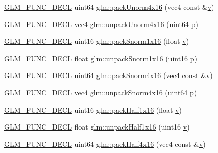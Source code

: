 \begin{DoxyCompactItemize}
\item 
\mbox{\hyperlink{setup_8hpp_ab2d052de21a70539923e9bcbf6e83a51}{G\+L\+M\+\_\+\+F\+U\+N\+C\+\_\+\+D\+E\+CL}} uint64 \mbox{\hyperlink{group__gtc__packing_gac561f06c908b7302537a8ef29fcb409e}{glm\+::pack\+Unorm4x16}} (vec4 const \&\mbox{\hyperlink{glad_8h_a14cfbe2fc2234f5504618905b69d1e06}{v}})
\item 
\mbox{\hyperlink{setup_8hpp_ab2d052de21a70539923e9bcbf6e83a51}{G\+L\+M\+\_\+\+F\+U\+N\+C\+\_\+\+D\+E\+CL}} vec4 \mbox{\hyperlink{group__gtc__packing_gafb2b502bc406031a5618ce930139a9e3}{glm\+::unpack\+Unorm4x16}} (uint64 p)
\item 
\mbox{\hyperlink{setup_8hpp_ab2d052de21a70539923e9bcbf6e83a51}{G\+L\+M\+\_\+\+F\+U\+N\+C\+\_\+\+D\+E\+CL}} uint16 \mbox{\hyperlink{group__gtc__packing_gac29411d6c0f6ed0fe9f0396dfe92e0e8}{glm\+::pack\+Snorm1x16}} (float \mbox{\hyperlink{glad_8h_a14cfbe2fc2234f5504618905b69d1e06}{v}})
\item 
\mbox{\hyperlink{setup_8hpp_ab2d052de21a70539923e9bcbf6e83a51}{G\+L\+M\+\_\+\+F\+U\+N\+C\+\_\+\+D\+E\+CL}} float \mbox{\hyperlink{group__gtc__packing_ga246f451cebf590726324f7a283e3d65e}{glm\+::unpack\+Snorm1x16}} (uint16 p)
\item 
\mbox{\hyperlink{setup_8hpp_ab2d052de21a70539923e9bcbf6e83a51}{G\+L\+M\+\_\+\+F\+U\+N\+C\+\_\+\+D\+E\+CL}} uint64 \mbox{\hyperlink{group__gtc__packing_ga9b237d7c66b7a71964e6d1f4dc06539f}{glm\+::pack\+Snorm4x16}} (vec4 const \&\mbox{\hyperlink{glad_8h_a14cfbe2fc2234f5504618905b69d1e06}{v}})
\item 
\mbox{\hyperlink{setup_8hpp_ab2d052de21a70539923e9bcbf6e83a51}{G\+L\+M\+\_\+\+F\+U\+N\+C\+\_\+\+D\+E\+CL}} vec4 \mbox{\hyperlink{group__gtc__packing_ga1bfaa3f217fd7a4b6b9d3117ecb3fcac}{glm\+::unpack\+Snorm4x16}} (uint64 p)
\item 
\mbox{\hyperlink{setup_8hpp_ab2d052de21a70539923e9bcbf6e83a51}{G\+L\+M\+\_\+\+F\+U\+N\+C\+\_\+\+D\+E\+CL}} uint16 \mbox{\hyperlink{group__gtc__packing_gaba534b320836a35372e00af5771dd1a2}{glm\+::pack\+Half1x16}} (float \mbox{\hyperlink{glad_8h_a14cfbe2fc2234f5504618905b69d1e06}{v}})
\item 
\mbox{\hyperlink{setup_8hpp_ab2d052de21a70539923e9bcbf6e83a51}{G\+L\+M\+\_\+\+F\+U\+N\+C\+\_\+\+D\+E\+CL}} float \mbox{\hyperlink{group__gtc__packing_gaa6eebcdfc746584b7d1823f1d5344fed}{glm\+::unpack\+Half1x16}} (uint16 \mbox{\hyperlink{glad_8h_a14cfbe2fc2234f5504618905b69d1e06}{v}})
\item 
\mbox{\hyperlink{setup_8hpp_ab2d052de21a70539923e9bcbf6e83a51}{G\+L\+M\+\_\+\+F\+U\+N\+C\+\_\+\+D\+E\+CL}} uint64 \mbox{\hyperlink{group__gtc__packing_ga8104f0b719b7792491f2b789a6dd6f96}{glm\+::pack\+Half4x16}} (vec4 const \&\mbox{\hyperlink{glad_8h_a14cfbe2fc2234f5504618905b69d1e06}{v}})

\end{DoxyCompactItemize}
